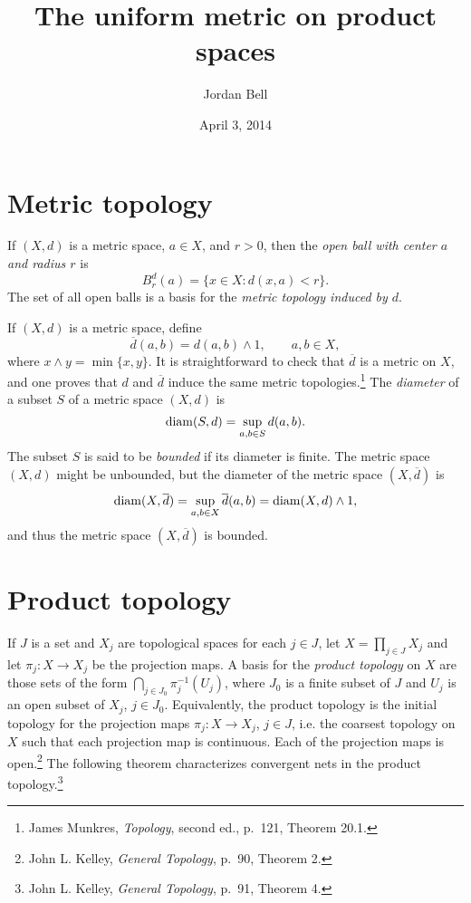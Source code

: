 \documentclass{article}
\newcommand{\diam}{\ensuremath\mathrm{diam}}
\theoremstyle{definition}
\begin{document}
\title{The uniform metric on product spaces}
\author{Jordan Bell}
\date{April 3, 2014}

\maketitle

\section{Metric topology}
If $(X,d)$ is a metric space, $a \in X$, and $r>0$, then the {\em open ball with center $a$ and radius $r$} is 
\[
B_r^d(a)=\{x \in X: d(x,a)<r\}.
\]
The set of all open balls is a basis for 
the {\em metric topology induced by $d$}.

If $(X,d)$ is a metric space,  define
\[
\overline{d}(a,b)=d(a,b) \wedge 1, \qquad a,b \in X,
\]
where $x \wedge y = \min\{x,y\}$.
It is straightforward to check that $\overline{d}$ is a metric on $X$, and one proves that $d$ and $\overline{d}$ induce the same metric
topologies.\footnote{James Munkres, {\em Topology}, second ed., p.~121, Theorem 20.1.}
The {\em diameter} of a subset $S$ of a metric space $(X,d)$ is
\[
\diam (S,d)=\sup_{a,b \in S} d(a,b).
\]
The subset $S$ is said to be {\em bounded} if its diameter is finite. 
The metric space $(X,d)$ might  be unbounded, but the diameter of the metric space
$(X,\overline{d})$ is 
\[
\diam(X,\overline{d})= \sup_{a,b \in X} \overline{d}(a,b)= \diam(X,d) \wedge 1,
\]
and thus the metric space $(X,\overline{d})$ is bounded.

\section{Product topology}
If $J$ is a set and $X_j$ are topological spaces for each $j \in J$, let $X=\prod_{j \in J} X_j$ and let $\pi_j:X \to X_j$ be the projection maps.
A basis for the {\em product topology} on $X$ are those sets of the form $\bigcap_{j \in J_0} \pi_j^{-1}(U_j)$, where $J_0$ is a finite subset
of $J$ and $U_j$ is an open subset of $X_j$, $j \in J_0$.
Equivalently, the product topology is the initial topology for the projection maps $\pi_j:X \to X_j$, $j \in J$, i.e. the coarsest topology on $X$ such that
each projection map is continuous. Each of the projection maps is open.\footnote{John L. Kelley, {\em General Topology},
p.~90, Theorem 2.}  The following theorem characterizes convergent nets in the product topology.\footnote{John L. Kelley, {\em General Topology}, p.~91, Theorem 4.}
\end{document}
